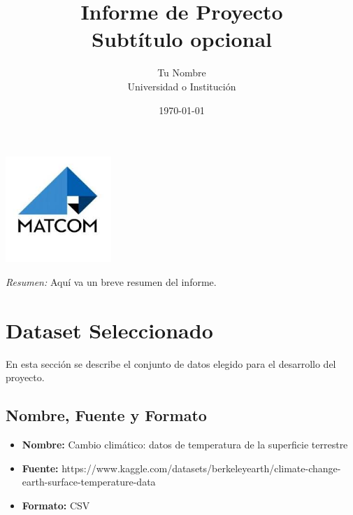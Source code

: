\documentclass[12pt,a4paper]{scrartcl}
\title{\Huge\bfseries Informe de Proyecto\\[1ex] \Large Subtítulo opcional}
\author{Tu Nombre\\[1ex] \small Universidad o Institución}
\date{\today}
\begin{document}
\maketitle
\thispagestyle{empty}
\begin{center}
    \includegraphics[width=0.3\textwidth]{matcom.jpeg} %
\end{center}
\vfill
\begin{center}
    \textit{Resumen:} Aquí va un breve resumen del informe.
\end{center}
\newpage

\tableofcontents

\newpage
\section{Dataset Seleccionado}
En esta sección se describe el conjunto de datos elegido para el desarrollo del proyecto.


\subsection{Nombre, Fuente y Formato}
\begin{itemize}
    \item \textbf{Nombre:} Cambio climático: datos de temperatura de la superficie terrestre
    \item \textbf{Fuente:} https://www.kaggle.com/datasets/berkeleyearth/climate-change-earth-surface-temperature-data
    \item \textbf{Formato:} CSV
\end{itemize}
\end{document}
